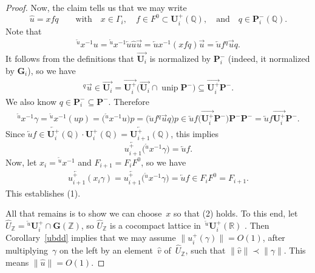 \documentclass[11pt]{article}
\numberwithin{equation}{section}
\newcommand{\QQ}{\mathbb{Q}}
\newcommand{\RR}{\mathbb{R}}
\newcommand{\ZZ}{\mathbb{Z}}
\newcommand{\Ga}{\mathbf{G}}
\newcommand{\Pa}{\mathbf{P}}
\newcommand{\Ua}{\mathbf{U}}
\DeclareMathOperator{\unip}{unip}
\newcommand{\ra}{\overrightarrow}
\newcommand{\la}{\overleftarrow}
\numberwithin{equation}{section}
\theoremstyle{definition}
\begin{document}
\begin{proof}
Now, the claim tells us that we may write
	\[ \widehat{u} = x f q \qquad \text{with} \quad x \in \Gamma_i, \quad f \in F^0 \subset \Ua^+_i(\QQ), \quad \text{and} \quad q \in \Pa_i^-(\QQ) .\]
Note that
	\begin{gather*}
	 {}^{\overleftarrow{u}} \! \! x^{-1} u
	 = {}^{\overleftarrow{u}} \! \! x^{-1} \overleftarrow{u} \widehat{u} \overrightarrow{u}
	= \overleftarrow{u} x^{-1} (x f q) \overrightarrow{u}
	= \overleftarrow{u} f {}^q \overrightarrow{u} q
	. \end{gather*}
It follows from the definitions that $\ra{\Ua_i}$ is normalized by $\Pa_i^-$ (indeed, it normalized by $\Ga_i$), so we have
	\begin{gather} \label{quplus}
	{}^q \overrightarrow{u}
	\in \ra{\Ua_i}
	= \ra{\Ua_i^+} \big(\ra{\Ua_i} \cap \unip \Pa^-\big)
	\subseteq \ra{\Ua_i^+} \Pa^-
	. \end{gather}
We also know $q \in \Pa_i^- \subseteq \Pa^-$. Therefore
	\begin{gather} \label{usgamma}
	{}^{\overleftarrow{u}} \! \! x^{-1} \gamma
	= {}^{\overleftarrow{u}} \! \! x^{-1} (u p)
	= \big({}^{\overleftarrow{u}} \! \! x^{-1} u\big) p
	= \big(\overleftarrow{u} f {}^q \overrightarrow{u} q\big) p
	\in \overleftarrow{u} f \big(\ra{\Ua_i^+} \Pa^-\big) \Pa^- \Pa^-
	= \overleftarrow{u} f \ra{\Ua_i^+} \Pa^-
	. \end{gather}
Since $\overleftarrow{u} f \in \la{\Ua^+_i}(\QQ) \cdot \Ua^+_i(\QQ) = \la{\Ua^+_{i+1}}(\QQ)$, this implies
	\[ \la{u^+_{i+1}} \big( {}^{\overleftarrow{u}} \! \! x^{-1} \gamma\big) = \overleftarrow{u} f .\]
Now, let $x_i = {}^{\overleftarrow{u}} \! \! x^{-1}$ and $F_{i+1} = F_i F^0$, so we have
	\begin{gather*}
	\la{u^+_{i+1}} ( x_i \gamma)
	= \la{u^+_{i+1}} \big( {}^{\overleftarrow{u}} \! \! x^{-1} \gamma\big)
	= \overleftarrow{u} f
	\in F_i F^0
	= F_{i+1}
	. \end{gather*}
This establishes (1).

All that remains is to show we can choose~$x$ so that (2) holds.
To this end, let $\widehat{U}_\ZZ = {}^{\overleftarrow{u}}\Ua^+_i \cap \Ga(\ZZ)$, so $\widehat{U}_\ZZ$ is a cocompact lattice in~${}^{\overleftarrow{u}}\Ua^+_i(\RR)$ \cite[Theorem~4.12, p.~210]{MR1278263}. Then Corollary~\ref{ubdd} implies that we may assume
	$\| u^+_i(\gamma) \| = O(1) $,
after multiplying~$\gamma$ on the left by an element~$\widehat{v}$ of~$\widehat{U}_\ZZ$, such that $\| \widehat{v} \| \prec \| \gamma \|$. This means $\| \widehat u \| = O(1)$.


\end{proof}
\end{document}
